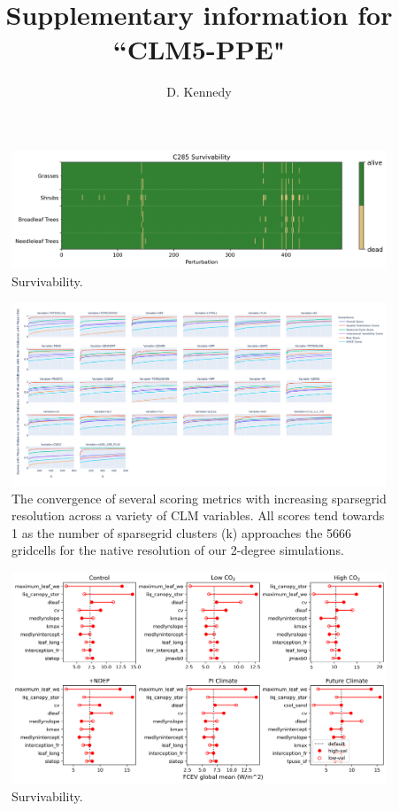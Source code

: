 \documentclass[11pt]{article}
\title{Supplementary information for ``CLM5-PPE"}
\author{D. Kennedy}
\begin{document}
\maketitle

\begin{figure}[h]
\centering
\includegraphics[width=\textwidth]{figs/supp/survivability_c285.png}
\caption{Survivability.}
\label{supp:surv}
\end{figure}

\begin{landscape}
\begin{figure}[h]
\centering
\includegraphics[width=60pc]{figs/supp/ilamb_lines.png}
\caption{The convergence of several scoring metrics with increasing sparsegrid resolution across a variety of CLM variables. All scores tend towards 1 as the number of sparsegrid clusters (k) approaches the 5666 gridcells for the native resolution of our 2-degree simulations. }
\label{supp:ilamb}
\end{figure}
\end{landscape}

\begin{figure}[h]
\centering
\includegraphics[width=\textwidth]{figs/supp/FCEV_global_mean.png}
\caption{Survivability.}
\label{supp:fcev}
\end{figure}
\end{document}
